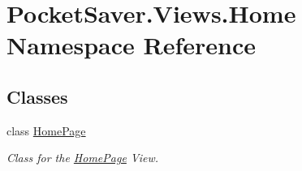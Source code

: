 \hypertarget{namespace_pocket_saver_1_1_views_1_1_home}{}\section{Pocket\+Saver.\+Views.\+Home Namespace Reference}
\label{namespace_pocket_saver_1_1_views_1_1_home}
\subsection*{Classes}
\begin{DoxyCompactItemize}
\item 
class \hyperlink{class_pocket_saver_1_1_views_1_1_home_1_1_home_page}{Home\+Page}
\begin{DoxyCompactList}\small\item\em Class for the \hyperlink{class_pocket_saver_1_1_views_1_1_home_1_1_home_page}{Home\+Page} View. \end{DoxyCompactList}\end{DoxyCompactItemize}
